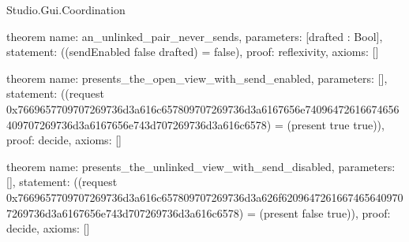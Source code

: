 \begin{lexlean}{Studio.Gui.Coordination}
\begin{semanticmodule}
theorem{
  name: an_unlinked_pair_never_sends,
  parameters: [drafted : Bool],
  statement: ((sendEnabled false drafted) = false),
  proof: reflexivity{},
  axioms: []
}

theorem{
  name: presents_the_open_view_with_send_enabled,
  parameters: [],
  statement: ((request 0x7669657709707269736d3a616c657809707269736d3a6167656e74096472616674656409707269736d3a6167656e743d707269736d3a616c6578) = (present true true)),
  proof: decide{},
  axioms: []
}

theorem{
  name: presents_the_unlinked_view_with_send_disabled,
  parameters: [],
  statement: ((request 0x7669657709707269736d3a616c657809707269736d3a626f62096472616674656409707269736d3a6167656e743d707269736d3a616c6578) = (present false true)),
  proof: decide{},
  axioms: []
}
\end{semanticmodule}
\end{lexlean}
